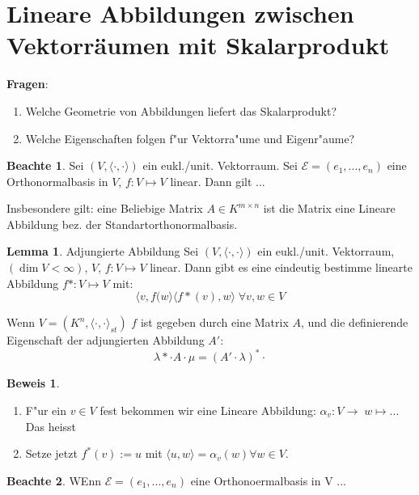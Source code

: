 \documentclass[oneside,fontsize=11pt,paper=a4,BCOR=0mm,DIV=12,automark,headsepline]{scrbook}
\theoremstyle{remark}
\theoremstyle{definition}
\newtheorem*{notte}{Beachte}
\newtheorem{lemma}{Lemma}[section]
\theoremstyle{definition}
\newtheorem*{prof}{Beweis}
\theoremstyle{remark}
\begin{document}
\section{Lineare Abbildungen zwischen Vektorräumen mit Skalarprodukt }
\label{sec:vsk}
\textbf{Fragen}:
\begin{enumerate}
\item Welche Geometrie von Abbildungen liefert das Skalarprodukt?
\item Welche Eigenschaften folgen f"ur Vektorra"ume und Eigenr"aume?
\end{enumerate}

\begin{notte}
  Sei $(V, \langle {\cdot, \cdot} \rangle)$ ein eukl./unit. Vektorraum. Sei
  $\mathcal{E}=(e_1,...,e_n)$ eine Orthonormalbasis in $V$, $f: V\mapsto V $
  linear. Dann gilt ...

  Insbesondere gilt: eine Beliebige Matrix $A\in K^{m\times n}$ ist die Matrix
  eine Lineare Abbildung bez. der Standartorthonormalbasis.
\end{notte}

\begin{lemma}{Adjungierte Abbildung}
  Sei $(V, \langle {\cdot, \cdot} \rangle)$ ein eukl./unit. Vektorraum, $(\dim V
  < \infty)$, $V$, $f: V\mapsto V $ linear. Dann gibt es eine eindeutig bestimme
  linearte Abbildung $f*: V\mapsto V $ mit: \[
    \langle {v, f(w} \rangle \langle {f*(v), w} \rangle\; \forall v, w \in V
  \]
\end{lemma}

\begin{exa}
  Wenn $V=(K^n, \langle {\cdot, \cdot} \rangle _{st})$ $f$ ist gegeben durch
  eine Matrix $A$, und die definierende Eigenschaft der adjungierten Abbildung
  $A'$:
  \[ \lambda*\cdot A \cdot \mu = (A'\cdot \lambda)^*\cdot\]
\end{exa}

\begin{prof}
  \begin{enumerate}
  \item F"ur ein $v\in V$ fest bekommen wir eine Lineare Abbildung: $\alpha_v:
    V\rightarrow \; w \mapsto $... Das heisst
  \item Setze jetzt $f^*(v):=u$ mit $\langle {u, w} \rangle = \alpha_v(w)\forall
    w\in V$. 
  \end{enumerate}
\end{prof}

\begin{notte}
  WEnn $\mathcal{E}=(e_1, ..., e_n)$ eine Orthonoermalbasis in V ...
\end{notte}
\end{document}
